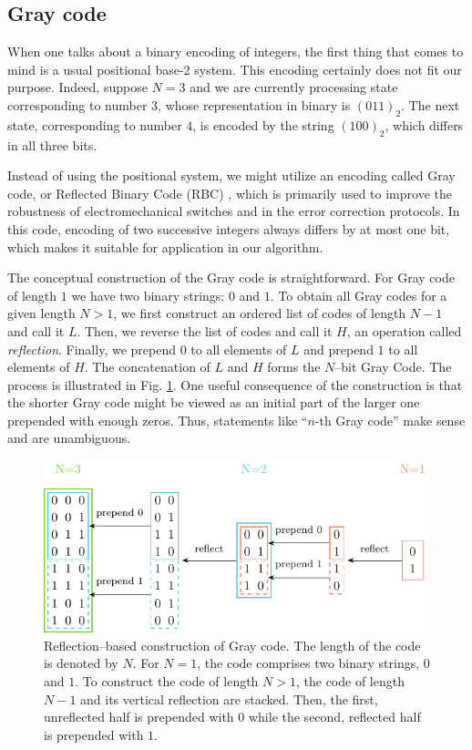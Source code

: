 \subsection{Gray code}
When one talks about a binary encoding of integers, the first thing that comes
to mind is a usual positional base-2 system. This encoding certainly does not
fit our purpose. Indeed, suppose $N=3$ and we are currently processing state
corresponding to number $3$, whose representation in binary is $(011)_{2}$. The
    next state, corresponding to number $4$, is encoded by the string $(100)_{2}$, which
differs in all three bits.

Instead of using the positional system, we might utilize an encoding called
Gray code, or Reflected Binary Code (RBC) \cite{gray,lucal1959}, which is
primarily used to improve the robustness of electromechanical switches and in
the error correction protocols. In this code, encoding of two successive
integers always differs by at most one bit, which makes it suitable for
application in our algorithm.

The conceptual construction of the Gray code is straightforward. For Gray code
of length $1$ we have two binary strings: $0$ and $1$. To obtain all Gray codes
for a given length $N > 1$, we first construct an ordered list of codes of
length $N-1$ and call it $L$. Then, we reverse the list of codes and call it
$H$, an operation called \emph{reflection}. Finally, we prepend $0$ to all
elements of $L$ and prepend $1$ to all elements of $H$. The concatenation of
$L$ and $H$ forms the $N$--bit Gray Code. The process is illustrated in Fig.
\ref{fig:gray}. One useful consequence of the construction is that the shorter
Gray code might be viewed as an initial part of the larger one prepended with
enough zeros. Thus, statements like ``$n$-th Gray code'' make sense and are
unambiguous.

\begin{figure}
  \includegraphics[width=\textwidth]{figures/gray.pdf}
  \caption{Reflection--based construction of Gray code. The length of the code is denoted
    by $N$. For $N=1$, the code comprises two binary strings, $0$ and $1$. To
    construct the code of length $N>1$, the code of length $N-1$ and its vertical
    reflection are stacked. Then, the first, unreflected half is prepended with $0$
    while the second, reflected half is prepended with $1$.} \label{fig:gray}
\end{figure}

